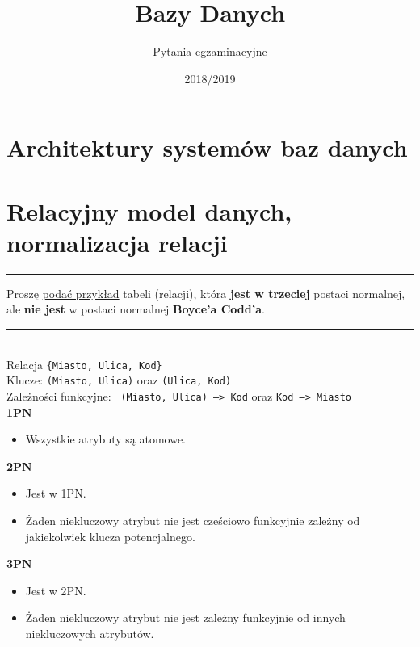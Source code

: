 \documentclass[a5paper,6pt]{article}
\title{Bazy Danych}
\author{Pytania egzaminacyjne}
\date{2018/2019}
\newcommand{\horrule}[1]{\rule{\linewidth}{#1}}
\begin{document}
    \maketitle
    \tableofcontents
    \pagebreak

    \section{Architektury systemów baz danych} %
    \label{sec:architektury_systemow}


    \section{Relacyjny model danych, normalizacja relacji} %
    \label{sec:relacyjny_model_danych_normalizacja_relacji}

    \horrule{0.5pt}
    Proszę \underline{podać przykład} tabeli (relacji), która \textbf{jest w
    trzeciej} postaci normalnej, ale \textbf{nie jest} w postaci normalnej
    \textbf{Boyce’a Codd’a}.\\
    \horrule{0.5pt}\\

    Relacja \texttt{\{Miasto, Ulica, Kod\}}\\
    Klucze: \texttt{(Miasto, Ulica)} oraz \texttt{(Ulica, Kod)}\\
    Zależności funkcyjne: \texttt{ (Miasto, Ulica) --> Kod} oraz
                          \texttt{Kod --> Miasto}\\

    \textbf{1PN}
    \begin{itemize}
        \item Wszystkie atrybuty są atomowe.
    \end{itemize}

    \textbf{2PN}
    \begin{itemize}
        \item Jest w 1PN.
        \item Żaden niekluczowy atrybut nie jest
              cześciowo funkcyjnie zależny od jakiekolwiek klucza potencjalnego.
    \end{itemize}

    \textbf{3PN}
    \begin{itemize}
        \item Jest w 2PN.
        \item Żaden niekluczowy atrybut nie jest zależny
              funkcyjnie od innych niekluczowych atrybutów.
    \end{itemize}
\end{document}
